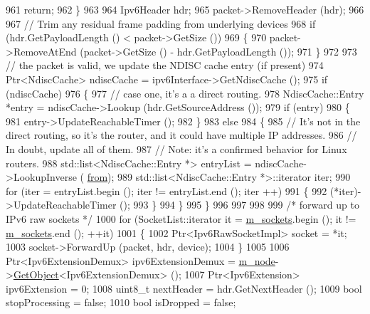 \begin{DoxyCode}
961       \textcolor{keywordflow}{return};
962     \}
963 
964   Ipv6Header hdr;
965   packet->RemoveHeader (hdr);
966 
967   \textcolor{comment}{// Trim any residual frame padding from underlying devices}
968   \textcolor{keywordflow}{if} (hdr.GetPayloadLength () < packet->GetSize ())
969     \{
970       packet->RemoveAtEnd (packet->GetSize () - hdr.GetPayloadLength ());
971     \}
972 
973   \textcolor{comment}{// the packet is valid, we update the NDISC cache entry (if present)}
974   Ptr<NdiscCache> ndiscCache = ipv6Interface->GetNdiscCache ();
975   \textcolor{keywordflow}{if} (ndiscCache)
976     \{
977       \textcolor{comment}{// case one, it's a a direct routing.}
978       NdiscCache::Entry *entry = ndiscCache->Lookup (hdr.GetSourceAddress ());
979       \textcolor{keywordflow}{if} (entry)
980         \{
981           entry->UpdateReachableTimer ();
982         \}
983       \textcolor{keywordflow}{else}
984         \{
985           \textcolor{comment}{// It's not in the direct routing, so it's the router, and it could have multiple IP addresses.}
986           \textcolor{comment}{// In doubt, update all of them.}
987           \textcolor{comment}{// Note: it's a confirmed behavior for Linux routers.}
988           std::list<NdiscCache::Entry *> entryList = ndiscCache->LookupInverse (
      \hyperlink{lte__amc_8m_a1b4c81ff74eb1a626b5ade44c81004b3}{from});
989           std::list<NdiscCache::Entry *>::iterator iter;
990           \textcolor{keywordflow}{for} (iter = entryList.begin (); iter != entryList.end (); iter ++)
991             \{
992               (*iter)->UpdateReachableTimer ();
993             \}
994         \}
995     \}
996 
997 
998 
999   \textcolor{comment}{/* forward up to IPv6 raw sockets */}
1000   \textcolor{keywordflow}{for} (SocketList::iterator it = \hyperlink{classns3_1_1Ipv6L3Protocol_a515e9cba13d7fd95e5613f5c95ccc7b5}{m\_sockets}.begin (); it != \hyperlink{classns3_1_1Ipv6L3Protocol_a515e9cba13d7fd95e5613f5c95ccc7b5}{m\_sockets}.end (); ++it)
1001     \{
1002       Ptr<Ipv6RawSocketImpl> socket = *it;
1003       socket->ForwardUp (packet, hdr, device);
1004     \}
1005 
1006   Ptr<Ipv6ExtensionDemux> ipv6ExtensionDemux = \hyperlink{classns3_1_1Ipv6L3Protocol_a543d8509395ee76de15d039ff1fce642}{m\_node}->\hyperlink{classns3_1_1Object_a13e18c00017096c8381eb651d5bd0783}{GetObject}<Ipv6ExtensionDemux> ();
1007   Ptr<Ipv6Extension> ipv6Extension = 0;
1008   uint8\_t nextHeader = hdr.GetNextHeader ();
1009   \textcolor{keywordtype}{bool} stopProcessing = \textcolor{keyword}{false};
1010   \textcolor{keywordtype}{bool} isDropped = \textcolor{keyword}{false};

\end{DoxyCode}
